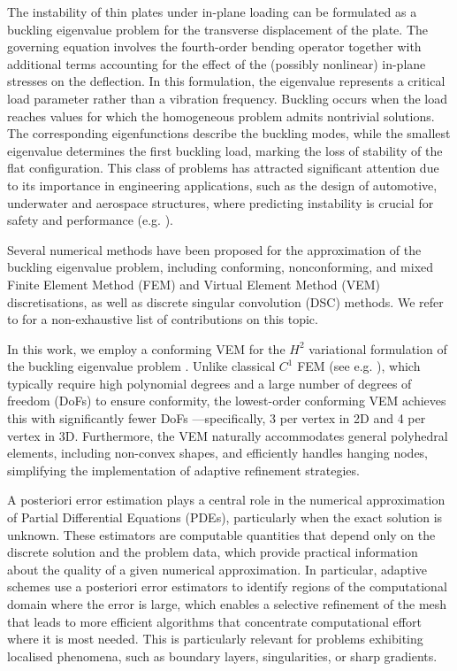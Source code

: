 \documentclass[final,reqno]{elsarticle}
\begin{document}
The instability of thin plates under in-plane loading can be formulated as a buckling eigenvalue problem for the transverse displacement of the plate. The governing equation involves the fourth-order bending operator together with additional terms accounting for the effect of the (possibly nonlinear) in-plane stresses on the deflection. In this formulation, the eigenvalue represents a critical load parameter rather than a vibration frequency. Buckling occurs when the load reaches values for which the homogeneous problem admits nontrivial solutions. The corresponding eigenfunctions describe the buckling modes, while the smallest eigenvalue determines the first buckling load, marking the loss of stability of the flat configuration. This class of problems has attracted significant attention due to its importance in engineering applications, such as the design of automotive, underwater and aerospace structures, where predicting instability is crucial for safety and performance (e.g. \cite{BYUN2011274,YORK1998665}).

Several numerical methods have been proposed for the approximation of the buckling eigenvalue problem, including conforming, nonconforming, and mixed Finite Element Method (FEM) and Virtual Element Method (VEM) discretisations, as well as discrete singular convolution (DSC) methods. We refer to 
\cite{ADAK2023115763,Brenner_VK2017,CWCC2017,CKD,I2,MM2015,MoraVelasquez2020,Ra} for a non-exhaustive list of contributions on this topic. 

In this work, we employ a conforming VEM for the $H^2$ variational formulation of the buckling eigenvalue problem \cite{ABSV2016,BDR2019C1Polyhedral}. Unlike classical $C^1$ FEM (see e.g. \cite{ciarlet}), which typically require high polynomial degrees and a large number of degrees of freedom (DoFs) to ensure conformity, the lowest-order conforming VEM achieves this with significantly fewer DoFs ---specifically, 3 per vertex in 2D and 4 per vertex in 3D. Furthermore, the VEM naturally accommodates general polyhedral elements, including non-convex shapes, and efficiently handles hanging nodes, simplifying the implementation of adaptive refinement strategies.

A posteriori error estimation plays a central role in the numerical approximation of Partial Differential Equations (PDEs), particularly when the exact solution is unknown. These estimators are computable quantities that depend only on the discrete solution and the problem data, which provide practical information about the quality of a given numerical approximation. In particular, adaptive schemes use a posteriori error estimators to identify regions of the computational domain where the error is large, which enables a selective refinement of the mesh that leads to more efficient algorithms that concentrate computational effort where it is most needed. This is particularly relevant for problems exhibiting localised phenomena, such as boundary layers, singularities, or sharp gradients. 
\end{document}
